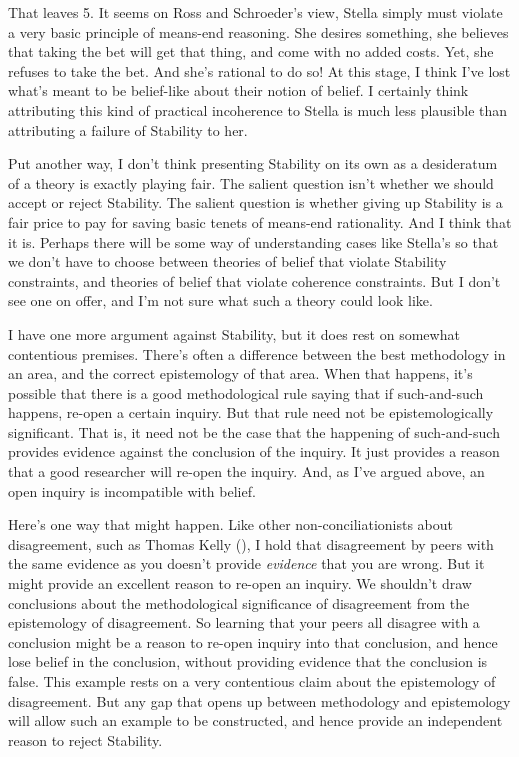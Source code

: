 \documentclass[
  12pt,
  letterpaper,
]{scrbook}
\begin{document}
That leaves 5. It seems on Ross and Schroeder's view, Stella simply must
violate a very basic principle of means-end reasoning. She desires
something, she believes that taking the bet will get that thing, and
come with no added costs. Yet, she refuses to take the bet. And she's
rational to do so! At this stage, I think I've lost what's meant to be
belief-like about their notion of belief. I certainly think attributing
this kind of practical incoherence to Stella is much less plausible than
attributing a failure of Stability to her.

Put another way, I don't think presenting Stability on its own as a
desideratum of a theory is exactly playing fair. The salient question
isn't whether we should accept or reject Stability. The salient question
is whether giving up Stability is a fair price to pay for saving basic
tenets of means-end rationality. And I think that it is. Perhaps there
will be some way of understanding cases like Stella's so that we don't
have to choose between theories of belief that violate Stability
constraints, and theories of belief that violate coherence constraints.
But I don't see one on offer, and I'm not sure what such a theory could
look like.

I have one more argument against Stability, but it does rest on somewhat
contentious premises. There's often a difference between the best
methodology in an area, and the correct epistemology of that area. When
that happens, it's possible that there is a good methodological rule
saying that if such-and-such happens, re-open a certain inquiry. But
that rule need not be epistemologically significant. That is, it need
not be the case that the happening of such-and-such provides evidence
against the conclusion of the inquiry. It just provides a reason that a
good researcher will re-open the inquiry. And, as I've argued above, an
open inquiry is incompatible with belief.

Here's one way that might happen. Like other non-conciliationists about
disagreement, such as Thomas Kelly
(), I hold that disagreement by
peers with the same evidence as you doesn't provide \emph{evidence} that
you are wrong. But it might provide an excellent reason to re-open an
inquiry. We shouldn't draw conclusions about the methodological
significance of disagreement from the epistemology of disagreement. So
learning that your peers all disagree with a conclusion might be a
reason to re-open inquiry into that conclusion, and hence lose belief in
the conclusion, without providing evidence that the conclusion is false.
This example rests on a very contentious claim about the epistemology of
disagreement. But any gap that opens up between methodology and
epistemology will allow such an example to be constructed, and hence
provide an independent reason to reject Stability.
\end{document}
